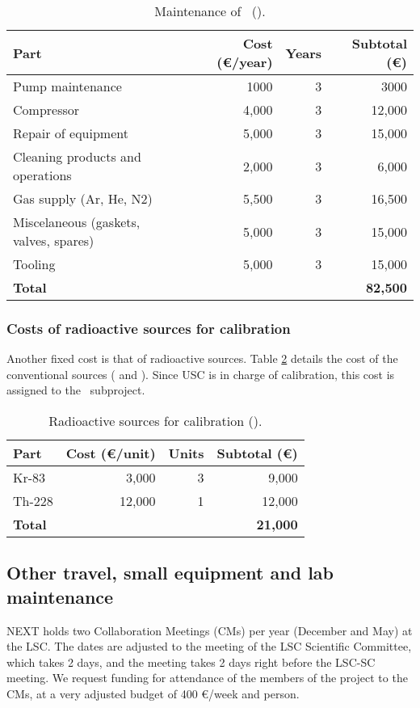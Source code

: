 \begin{table}[h!]
\begin{center}
\begin{tabular}{|l|r|r|r|}
\hline
Part & 	Cost (\euro/year)	& Years	& Subtotal (\euro) \\
\hline
Pump maintenance	& 1000	& 3	& 3000\\
Compressor              & 4,000 &	3	& 12,000 \\ 
Repair of equipment	& 5,000 &	3	&15,000 \\
Cleaning products and operations	& 2,000 &	3 & 6,000 \\
Gas supply (Ar, He, N2)  & 5,500 & 	3 &	16,500 \\
Miscelaneous (gaskets, valves, spares)	& 5,000 &	3 & 15,000 \\
Tooling	& 5,000 & 3 & 15,000 \\
\hline
{\bf Total} & & & {\bf 82,500}\\
\hline
\end{tabular}  
\caption{Maintenance of \Next\ (\sIFIC).}
\label{tab.main}
\end{center}
\end{table} 


\subsubsection{Costs of radioactive sources for calibration}

Another fixed cost is that of radioactive sources. Table \ref{tab.calib} details the cost of the conventional sources ( and ). Since USC is in charge of calibration, this cost is assigned to the \sUSC\ subproject.

\begin{table}[h!]
\begin{center}
\begin{tabular}{|l|r|r|r|}
\hline
Part & Cost (\euro/unit) & Units & Subtotal (\euro) \\
\hline  
Kr-83 &	3,000 &	3 & 9,000 \\
Th-228 &	12,000 & 1 & 12,000 \\
\hline
{\bf Total }   &  & &  {\bf 21,000} \\
\hline
\end{tabular}  
\caption{Radioactive sources for calibration (\sUSC).}
\label{tab.calib}
\end{center}
\end{table}

\subsection{Other travel, small equipment and lab maintenance}
NEXT holds two Collaboration Meetings (CMs) per year (December and May) at the LSC. The dates are adjusted to the meeting of the LSC Scientific Committee, which takes 2 days, and the meeting takes 2 days right before the LSC-SC meeting. We request funding for attendance of the members of the project to the CMs, at a very adjusted budget of 400 \euro/week and person.

